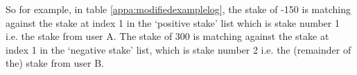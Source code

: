 So for example, in table \ref{appa:modifiedexamplelog}, the stake of -150 is matching against the stake at index 1 in the `positive stake' list which is stake number 1 i.e. the stake from user A. The stake of 300 is matching against the stake at index 1 in the `negative stake' list, which is stake number 2 i.e. the (remainder of the) stake from user B.